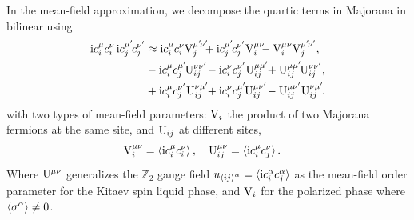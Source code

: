 In the mean-field approximation, we decompose the quartic terms in Majorana in bilinear using
\begin{equation}
\begin{split}
        \im c_i^\mu c_i^\nu \,
        \im c_j^ \mup  c_j^\nup
        &\approx \im c_i^\mu c_i^\nu  \rmV_{j}^{ \mup \nup} \!\!\! +   \im  c_j^ \mup   c_j^\nup  \rmV_{i}^{\mu\nu} \!\!\! - \rmV_{i}^{\mu\nu} \rmV_{j}^{ \mup \nup}   , \\
        &- \im c_i^\mu c_j^ \mup    \rmU_{i j }^{\nu\nup} \! - \im  c_i^\nu  c_j^\nup \rmU_{ij}^{\mu \mup }  \! + \rmU_{ij}^{\mu \mup }   \rmU_{i j }^{\nu\nup} , \\
        &+ \im c_i^\mu c_j^\nup   \rmU_{ij}^{\nu \mup } \! +  \im  c_i^\nu  c_j^ \mup  \rmU_{ij}^{\mu\nup} \!   -  \rmU_{ij}^{\mu\nup}  \rmU_{ij}^{\nu \mup } .  \label{eq:MF_decouple}
\end{split}
\end{equation}
with two types of mean-field parameters: $\mathrm{V}_i$ the product of two Majorana fermions at the same site, and $\mathrm{U}_{ij}$ at different sites, %
\begin{align}
        \mathrm{V}_{i}^{\mu\nu} &= \braket{\mathrm{i} c_i^\mu c_i^\nu } , \quad
        \mathrm{U}_{ij}^{\mu\nu} = \braket{\mathrm{i} c_i^\mu c_j^\nu } . \label{eq:MF_parameters}
\end{align}
Where $\mathrm{U}^{\mu\nu}$ generalizes the $\mathbb{Z}_2$ gauge field $u_{\braket{ij}^\alpha}=\braket{\mathrm{i} c^\alpha_i c^\alpha_j}$ as the mean-field order parameter for the Kitaev spin liquid phase, and $\mathrm{V}_i$ for the polarized phase where $\braket{\sigma^\alpha}\neq 0$.

